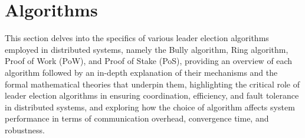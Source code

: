 \chapter{Algorithms}

This section delves into the specifics of various leader election algorithms employed in distributed systems, namely the Bully algorithm, Ring algorithm, Proof of Work (PoW), and Proof of Stake (PoS), providing an overview of each algorithm followed by an in-depth explanation of their mechanisms and the formal mathematical theories that underpin them, highlighting the critical role of leader election algorithms in ensuring coordination, efficiency, and fault tolerance in distributed systems, and exploring how the choice of algorithm affects system performance in terms of communication overhead, convergence time, and robustness.









